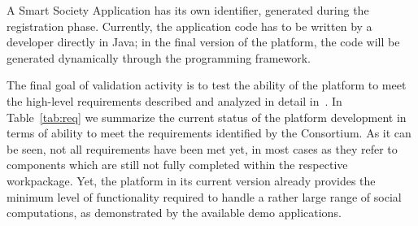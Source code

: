 A Smart Society Application has its own identifier, generated during the registration phase. Currently, the application code has to be written by a developer directly in Java; in the final version of the platform, the code will be generated dynamically through the programming framework. %

The final goal of validation activity is to test the ability of the platform to meet the high-level requirements %
described and analyzed in detail in~\cite{D8.1}. In Table~\ref{tab:req} we summarize the current status of the platform development in terms of ability to meet the requirements identified by the Consortium. As it can be seen, not all requirements have been met yet, in most cases as they refer to components which are still not fully completed within the respective workpackage. Yet, the platform in its current version already provides the minimum level of functionality required to handle a rather large range of social computations, as demonstrated by the available demo applications.

